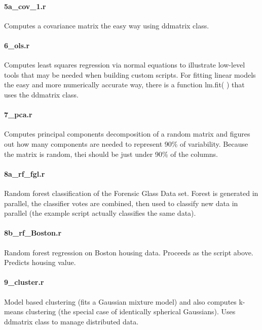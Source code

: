 \documentclass{article}
\begin{document}
\paragraph{5a\_cov\_1.r} Computes a covariance matrix the easy way
using ddmatrix class.

\paragraph{6\_ols.r} Computes least squares regression via normal
equations to illustrate low-level tools that may be needed when
building custom scripts. For fitting linear models the easy and more
numerically accurate way, there is a function lm.fit( ) that uses the
ddmatrix class.

\paragraph{7\_pca.r} Computes principal components decomposition of a
random matrix and figures out how many components are needed to
represent 90\% of variability. Because the matrix is random, thei
should be just under 90\% of the columns.

\paragraph{8a\_rf\_fgl.r} Random forest classification of the Forensic
Glass Data set. Forest is generated in parallel, the classifier votes
are combined, then used to classify new data in parallel (the example
script actually classifies the same data).

\paragraph{8b\_rf\_Boston.r} Random forest regression on Boston housing
data. Proceeds as the script above. Predicts housing value.

\paragraph{9\_cluster.r} Model based clustering (fits a Gaussian
mixture model) and also computes k-means clustering (the special case
of identically spherical Gaussians). Uses ddmatrix class to manage
distributed data.
\end{document}
